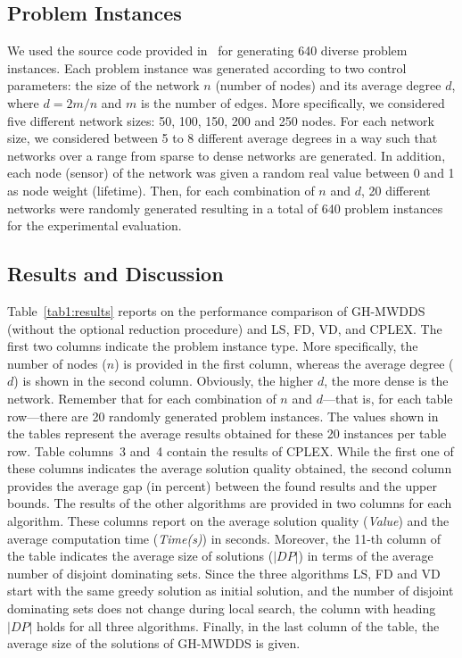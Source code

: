 \documentclass[algorithms,article,accept,moreauthors,pdftex]{Definitions/mdpi}
\begin{document}
\subsection{Problem Instances}

We used the source code provided in~\cite{pino2018:dominating} for generating 640 diverse problem instances. Each problem instance was generated according to two control parameters: the size of the network $n$ (number of nodes) and its average degree $d$, where $d = 2 m/n$ and $m$ is the number of edges. More specifically, we considered five different network sizes: 50, 100, 150, 200 and 250 nodes. For each network size, we considered between 5 to 8 different average degrees in a way such that networks over a range from sparse to dense networks are generated. In addition, each node (sensor) of the network was given a random real value between 0 and 1 as node weight (lifetime). Then, for each combination of $n$ and $d$, 20 different networks were randomly generated resulting in a total of 640 problem instances for the experimental evaluation. 



\subsection{Results and Discussion}

Table~\ref{tab1:results} reports on the performance comparison of GH-MWDDS (without the optional reduction procedure) and LS, FD, VD, and CPLEX. The first two columns indicate the problem instance type. More specifically, the number of nodes ($n$) is provided in the first column, whereas the average degree ($d$) is shown in the second column. Obviously, the higher $d$, the more dense is the network. Remember that for each combination of $n$ and $d$---that is, for each table row---there are 20 randomly generated problem instances. The values shown in the tables represent the average results obtained for these 20 instances per table row. Table columns~3 and~4 contain the results of CPLEX. While the first one of these columns indicates the average solution quality obtained, the second column provides the average gap (in percent) between the found results and the upper bounds. The results of the other algorithms are provided in two columns for each algorithm. These columns report on the average solution quality (\textit{Value}) and the average computation time (\textit{Time(s)}) in seconds. Moreover, the 11-th column of the table indicates the average size of solutions (${|DP|}$) in terms of the average number of disjoint dominating sets. Since the three algorithms LS, FD and VD start with the same greedy solution as initial solution, and the number of disjoint dominating sets does not change during local search, the column with heading ${|DP|}$ holds for all three algorithms. Finally, in the last column of the table, the average size of the solutions of GH-MWDDS is given. \\
\end{document}
